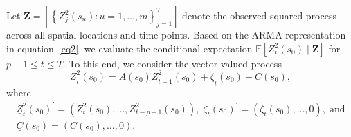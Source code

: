 \documentclass[fleqn,11pt]{article}
\begin{document}
Let  $\mathbf{Z}=\left[\left\{Z_j^2(s_u): u=1, \ldots, m\right\}_{j=1}^T\right]$ denote the observed squared process across all spatial locations and time points. Based on the ARMA representation in equation~\eqref{eq2}, we evaluate the conditional expectation $\mathbb{E}\left[Z_t^2\left(s_0\right) \mid \mathbf{Z}\right]$ for $p+1 \leq t \leq T$.  To this end, we consider the vector-valued process
\begin{equation}
\underline{Z}_t^2\left(s_0\right)=A\left(s_0\right) \underline{Z}_{t-1}^2\left(s_0\right)+\underline{\zeta}_t\left(s_0\right) + \underline{C}(s_0),
\end{equation}
where
\begin{eqnarray}
\underline{Z}_t^2\left(s_0\right)^{\prime}=\left(Z_t^2\left(s_0\right), \ldots, Z_{t-p+1}^2\left(s_0\right)\right), \; \zeta_t\left(s_0\right)^{\prime}=\left(\zeta_t\left(s_0\right) , \ldots, 0\right), \; \text{and} \nonumber \\
\underline{C}(s_0) =\left(C(s_0) , \ldots, 0\right) . 
\end{eqnarray}
\end{document}
